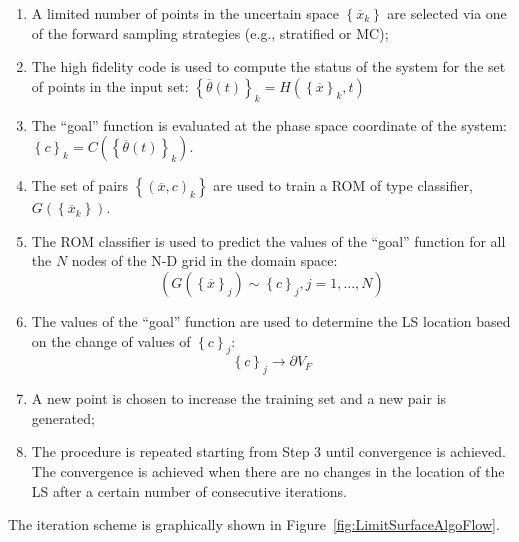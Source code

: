 \begin{enumerate}
  \item A limited number of points in the uncertain space $\left \{ 
  \overline{x}_{k} \right \}$ are selected via one of the forward 
  sampling strategies (e.g., stratified or MC);
  \item The high fidelity code is used to compute the status of the 
  system for the set of points in the input set: 
  $
  \left \{ \overline{\theta}(t)\right \}_{k} = H\left ( \left \{ \overline{x} \right 
  \}_{k},t \right )
  $
  \item The ``goal'' function is evaluated at the phase space coordinate 
  of the system:
  $\left \{ c \right \}_{k} = C\left ( \left \{ \overline{\theta}(t)\right \}_{k} 
  \right )$.
   \item The set of pairs $\left \{ \left ( \overline{x},c \right )_{k} \right \}$
   are used to train a ROM of type classifier, $G\left ( \left \{ 
   \overline{x}_{k} \right \} \right )$.
   \item The ROM classifier is used to predict the values of the ``goal''  
   function for all the $N$ nodes of the N-D grid in the domain space:
   \begin{equation}
   \left (G\left ( \left \{ \overline{x} \right \}_{j} \right ) \sim \left \{ c \right 
   \}_{j}, j=1,...,N  \right )
    \end{equation}
    \item The values of the ``goal''  function are used to determine the 
    LS location based on the change of values of  $\left \{ c \right 
    \}_{j}$:
    \begin{equation}
    \left \{ c \right \}_{j}\rightarrow \partial V_{F}
     \end{equation}
     \item A new point is chosen to increase the training set and a new 
     pair is generated;
     \item The procedure is repeated starting from Step 3 until 
     convergence is achieved. The convergence is achieved when 
     there are no changes in the location of the LS after a certain 
     number of consecutive iterations.
\end{enumerate}
The iteration scheme is graphically shown in 
Figure~\ref{fig:LimitSurfaceAlgoFlow}.
